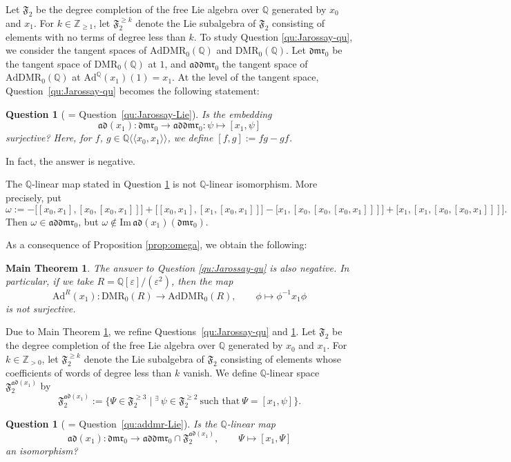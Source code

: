 \documentclass[15pt,oneside,reqno]{amsart}
\newtheorem{qu}[df]{Question}
\newtheorem{mt}{Main Theorem}
\theoremstyle{remark}{
\newtheorem{lem}[df]{Lemma}
\newtheorem{prop}[df]{Proposition}
\newtheorem{ex}[df]{Example}
\newtheorem{rmk}[df]{Remark}
}
\newcommand{\ide}[1]{\mathfrak{#1}}
\newcommand{\Q}{\mathbb{Q}}
\newcommand{\DMR}{\mathrm{DMR}}
\newcommand{\dmr}{\mathfrak{dmr}}
\newcommand{\AdDMR}{\mathrm{AdDMR}}
\newcommand{\addmr}{\mathfrak{addmr}}
\newcommand{\Ad}{\mathrm{Ad}}
\newcommand{\ad}{\mathfrak{ad}}
\newcommand{\Fad}{\mathfrak{F}_2^{\ad(x_1)}}
\begin{document}
Let $\ide{F}_2$ be the degree completion of the free Lie algebra over $\Q$ generated by $x_0$ and $x_1$. For $k \in \mathbb{Z}_{\ge 1}$, let $\ide{F}_2^{\ge k}$ denote the Lie subalgebra of $\ide{F}_2$ consisting of elements with no terms of degree less than $k$.
To study Question \ref{qu:Jarossay-qu}, we consider the tangent spaces of $\AdDMR_0(\Q)$ and $\DMR_0(\Q)$.
Let $\dmr_0$ be the tangent space of $\DMR_0(\Q)$ at $1$, and $\addmr_0$ the tangent space of $\AdDMR_0(\Q)$ at $\Ad^{\Q}(x_1)(1)=x_1$.
At the level of the tangent space, Question~\ref{qu:Jarossay-qu} becomes the following statement:
\begin{qu}[ = Question~\ref{qu:Jarossay-Lie}]\label{qu:Jarossay-qu-tan}
Is the embedding
\[
\ad(x_1) : \dmr_0 \rightarrow \addmr_0 : \psi \mapsto [x_1,\psi]
\]
surjective? Here, for $f$, $g \in \Q\langle\langle x_0,x_1 \rangle\rangle$, we define $[f,g] := fg - gf$.
\end{qu}
In fact, the answer is negative.
\begin{prop}\label{prop:omega}
The $\Q$-linear map stated in Question \ref{qu:Jarossay-qu-tan} is not $\Q$-linear isomorphism.
More precisely, put
\[
\omega :=
-\bigl[[x_0,x_1],[x_0,[x_0,x_1]]\bigr]
+\bigl[[x_0,x_1],[x_1,[x_0,x_1]]\bigr]
-\bigl[x_1,[x_0,[x_0,[x_0,x_1]]]\bigr]
+\bigl[x_1,[x_1,[x_0,[x_0,x_1]]]\bigr].
\]
Then $\omega\in \addmr_0$, but $\omega\notin \mathrm{Im}\,\ad(x_1)(\dmr_0)$.
\end{prop}
As a consequence of Proposition \ref{prop:omega}, we obtain the following:
\begin{mt}\label{mt:Jarossay-negative}
The answer to Question \ref{qu:Jarossay-qu} is also negative.
In particular, if we take $R=\Q[\varepsilon]/(\varepsilon^2)$, then the map
\[
\Ad^R(x_1)\colon \DMR_0(R)\longrightarrow \AdDMR_0(R),\qquad
\phi \longmapsto \phi^{-1}x_1\phi
\]
is not surjective.
\end{mt}
Due to Main Theorem \ref{mt:Jarossay-negative}, we refine Questions~\ref{qu:Jarossay-qu} and \ref{qu:Jarossay-qu-tan}.
Let $\ide{F}_2$ be the degree completion of the free Lie algebra over $\Q$ generated by $x_0$ and $x_1$.
For $k \in \mathbb{Z}_{>0}$, let $\ide{F}_2^{\ge k}$ denote the Lie subalgebra of $\ide{F}_2$ consisting of elements whose coefficients of words of degree less than $ k $ vanish.
We define $\Q$-linear space $\Fad$ by
\[
\Fad := \{\Psi \in \ide{F}_2^{\ge 3} \mid {}^\exists\, \psi \in \ide{F}_2^{\ge 2}\ \text{such that}\ \Psi = [x_1,\psi]\}.
\]
\begin{qu}[ = Question~\ref{qu:addmr-Lie}]\label{qu:Jarossay-Lie-intro}
Is the $\Q$-linear map
\[
\ad(x_1)\colon \dmr_0 \longrightarrow \addmr_0 \cap \Fad,\qquad \Psi \longmapsto [x_1,\Psi]
\]
an isomorphism?
\end{qu}
\end{document}
